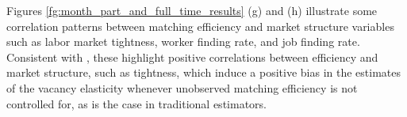 \documentclass[12pt]{article}
\begin{document}
Figures \ref{fg:month_part_and_full_time_results} (g) and (h) illustrate some correlation patterns between matching efficiency and market structure variables such as labor market tightness, worker finding rate, and job finding rate. Consistent with \cite{lange2020beyond}, these highlight positive correlations between efficiency and market structure, such as tightness, which induce a positive bias in the estimates of the vacancy elasticity whenever unobserved matching efficiency is not controlled for, as is the case in traditional estimators.


\begin{figure}[!ht]
  \begin{center}
  \\
\end{center}
\end{figure}
\end{document}
